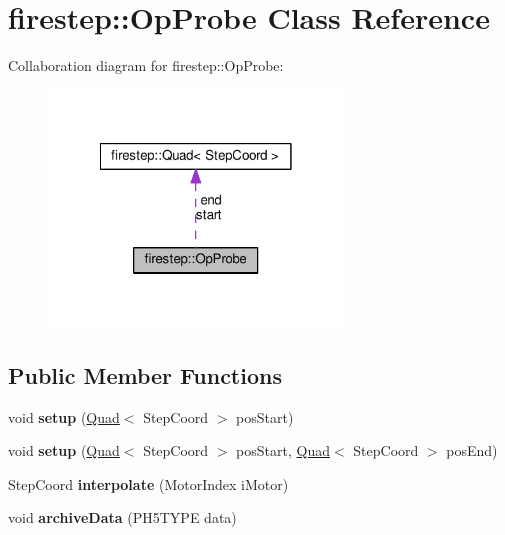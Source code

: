 \hypertarget{classfirestep_1_1_op_probe}{\section{firestep\+:\+:Op\+Probe Class Reference}
\label{classfirestep_1_1_op_probe}
}


Collaboration diagram for firestep\+:\+:Op\+Probe\+:\nopagebreak
\begin{figure}[H]
\begin{center}
\leavevmode
\includegraphics[width=222pt]{classfirestep_1_1_op_probe__coll__graph}
\end{center}
\end{figure}
\subsection*{Public Member Functions}
\begin{DoxyCompactItemize}
\item 
\hypertarget{classfirestep_1_1_op_probe_a458ffa766ae074c300380d9b2d0f0225}{void {\bfseries setup} (\hyperlink{classfirestep_1_1_quad}{Quad}$<$ Step\+Coord $>$ pos\+Start)}\label{classfirestep_1_1_op_probe_a458ffa766ae074c300380d9b2d0f0225}

\item 
\hypertarget{classfirestep_1_1_op_probe_a1791ea37a015521b021931dec1831077}{void {\bfseries setup} (\hyperlink{classfirestep_1_1_quad}{Quad}$<$ Step\+Coord $>$ pos\+Start, \hyperlink{classfirestep_1_1_quad}{Quad}$<$ Step\+Coord $>$ pos\+End)}\label{classfirestep_1_1_op_probe_a1791ea37a015521b021931dec1831077}

\item 
\hypertarget{classfirestep_1_1_op_probe_a3785370d148fcce00bade62b66a46357}{Step\+Coord {\bfseries interpolate} (Motor\+Index i\+Motor)}\label{classfirestep_1_1_op_probe_a3785370d148fcce00bade62b66a46357}

\item 
\hypertarget{classfirestep_1_1_op_probe_a4765e688e5391866353afd36dddf2a77}{void {\bfseries archive\+Data} (P\+H5\+T\+Y\+P\+E data)}\label{classfirestep_1_1_op_probe_a4765e688e5391866353afd36dddf2a77}

\end{DoxyCompactItemize}
